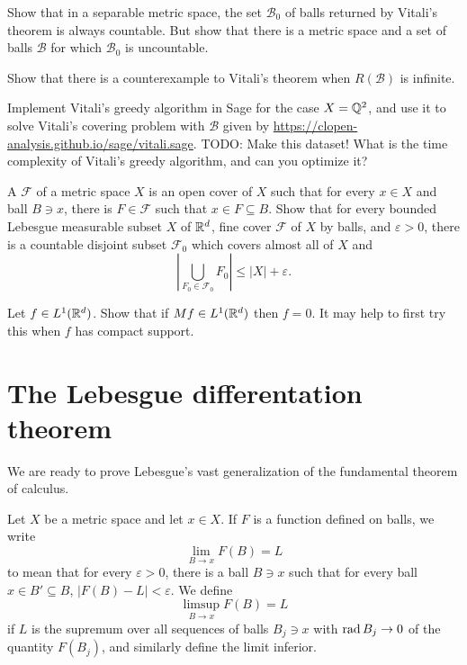 \begin{exercise}
Show that in a separable metric space, the set $\mathcal B_0$ of balls returned by Vitali's theorem is always countable.
But show that there is a metric space and a set of balls $\mathcal B$ for which $\mathcal B_0$ is uncountable.
\end{exercise}

\begin{exercise}
Show that there is a counterexample to Vitali's theorem when $R(\mathcal B)$ is infinite.
\end{exercise}

\begin{exercise}
Implement Vitali's greedy algorithm in Sage for the case $X = \mathbb{Q}^2$, and use it to solve Vitali's covering problem with $\mathcal B$ given by \url{https://clopen-analysis.github.io/sage/vitali.sage}. TODO: Make this dataset!
What is the time complexity of Vitali's greedy algorithm, and can you optimize it?
\end{exercise}

\begin{exercise}[Vitali]
A  $\mathcal F$ of a metric space $X$ is an open cover of $X$ such that for every $x \in X$ and ball $B \ni x$, there is $F \in \mathcal F$ such that $x \in F \subseteq B$.
Show that for every bounded Lebesgue measurable subset $X$ of $\mathbb{R}^d$, fine cover $\mathcal F$ of $X$ by balls, and $\varepsilon > 0$, there is a countable disjoint subset $\mathcal F_0$ which covers almost all of $X$ and
$$\left|\bigcup_{F_{0} \in \mathcal F_{0}} F_{0}\right| \leq |X| + \varepsilon.$$
\end{exercise}

\begin{exercise}
Let $f \in L^{1}(\mathbb{R}^{d})$.
Show that if $Mf \in L^{1}(\mathbb{R}^{d})$ then $f = 0$.
It may help to first try this when $f$ has compact support.
\end{exercise}

\section{The Lebesgue differentation theorem}
We are ready to prove Lebesgue's vast generalization of the fundamental theorem of calculus.

\begin{definition}
Let $X$ be a metric space and let $x \in X$.
If $F$ is a function defined on balls, we write
$$\lim_{B \to x} F(B) = L$$
to mean that for every $\varepsilon > 0$, there is a ball $B \ni x$ such that for every ball $x \in B' \subseteq B$, $|F(B) - L| < \varepsilon$.
We define
$$\limsup_{B \to x} F(B) = L$$
if $L$ is the supremum over all sequences of balls $B_j \ni x$ with $\operatorname{rad} B_j \to 0$ of the quantity $F(B_j)$, and similarly define the limit inferior.
\end{definition}

